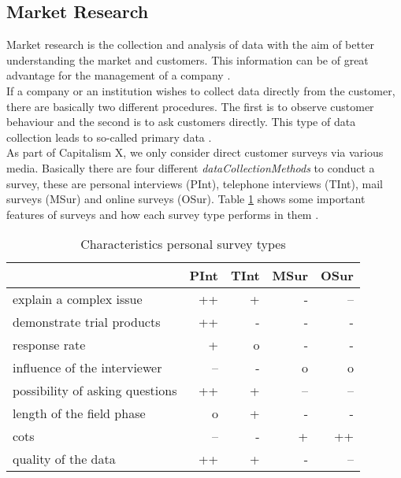 \subsection{Market Research} \label{market_research_simulation}


Market research is the collection and analysis of data with the aim of better understanding the market and customers. This information can be of great advantage for the management of a company \cite[Chapter~1.2]{mooi_introduction_2018}.\\

If a company or an institution wishes to collect data directly from the customer, there are basically two different procedures. The first is to observe customer behaviour and the second is to ask customers directly. This type of data collection leads to so-called primary data \cite[Chapter~4.4]{mooi_getting_2018}.\\

As part of Capitalism X, we only consider direct customer surveys via various media. Basically there are four different \textit{dataCollectionMethods} to conduct a survey, these are personal interviews (\gls{PInt}), telephone interviews (\gls{TInt}), mail surveys (\gls{MSur}) and online surveys (\gls{OSur}). Table \ref{MR_survey_types_characteristics} shows some important features of surveys and how each survey type performs in them \cite[Chapter~4.4.2.2]{mooi_getting_2018}.\\

\begin{table}[ht]
\centering
\begin{tabular}{|l|r|r|r|r|}
\hline
                                & PInt    & TInt    & MSur   & OSur \\
\hline                              
explain a complex issue         & ++    & +     & -    & --  \\
demonstrate trial products      & ++    & -     & -    & -   \\
response rate                   & +     & o     & -    & -   \\
influence of the interviewer    & --    & -     & o    & o   \\
possibility of asking questions & ++    & +     & --   & --  \\
length of the field phase       & o     & +     & -    & -   \\
cots                            & --    & -     & +    & ++  \\
quality of the data             & ++    & +     & -    & --  \\
\hline
\end{tabular}
\caption{Characteristics personal survey types}
\label{MR_survey_types_characteristics}
\end{table}


